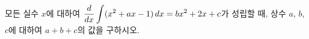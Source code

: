 모든 실수 $x$에 대하여 $\dfrac{d}{dx}\displaystyle\int (x^2+ax-1)\mkern3mu dx=bx^2+2x+c$가 성립할 때, 상수 $a$, $b$, $c$에 대하여 $a+b+c$의 값을 구하시오.
